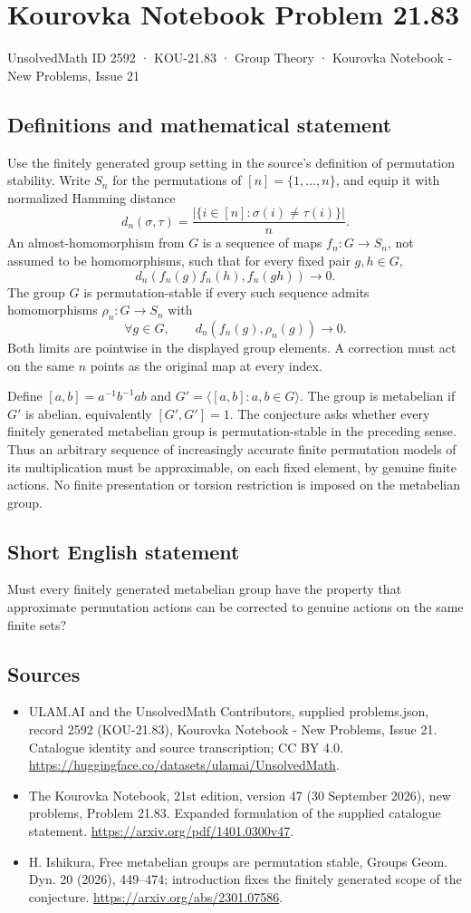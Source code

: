 \documentclass[11pt,a4paper]{article}
\begin{document}
\section*{Kourovka Notebook Problem 21.83}\label{2592}
{\small UnsolvedMath ID 2592 · KOU-21.83 · Group Theory · Kourovka Notebook - New Problems, Issue 21}
\subsection{Definitions and mathematical statement}
Use the finitely generated group setting in the source's definition of permutation stability. Write $S_n$ for the permutations of $[n]=\{1,\ldots,n\}$, and equip it with normalized Hamming distance
\[
 d_n(\sigma,\tau)=\frac{|\{i\in[n]:\sigma(i)\ne\tau(i)\}|}{n}.
\]
An almost-homomorphism from $G$ is a sequence of maps $f_n:G\to S_n$, not assumed to be homomorphisms, such that for every fixed pair $g,h\in G$,
\[
 d_n(f_n(g)f_n(h),f_n(gh))\longrightarrow0.
\]
The group $G$ is permutation-stable if every such sequence admits homomorphisms $\rho_n:G\to S_n$ with
\[
 \forall g\in G,\qquad d_n(f_n(g),\rho_n(g))\longrightarrow0.
\]
Both limits are pointwise in the displayed group elements. A correction must act on the same $n$ points as the original map at every index.

Define $[a,b]=a^{-1}b^{-1}ab$ and $G'=\langle[a,b]:a,b\in G\rangle$. The group is metabelian if $G'$ is abelian, equivalently $[G',G']=1$. The conjecture asks whether every finitely generated metabelian group is permutation-stable in the preceding sense. Thus an arbitrary sequence of increasingly accurate finite permutation models of its multiplication must be approximable, on each fixed element, by genuine finite actions. No finite presentation or torsion restriction is imposed on the metabelian group.
\subsection{Short English statement}
Must every finitely generated metabelian group have the property that approximate permutation actions can be corrected to genuine actions on the same finite sets?
\subsection{Sources}
\begin{itemize}
\item[S1] ULAM.AI and the UnsolvedMath Contributors, supplied problems.json, record 2592 (KOU-21.83), Kourovka Notebook - New Problems, Issue 21. Catalogue identity and source transcription; CC BY 4.0.
\url{https://huggingface.co/datasets/ulamai/UnsolvedMath}.
\item[S2] The Kourovka Notebook, 21st edition, version 47 (30 September 2026), new problems, Problem 21.83. Expanded formulation of the supplied catalogue statement.
\url{https://arxiv.org/pdf/1401.0300v47}.
\item[S3] H. Ishikura, Free metabelian groups are permutation stable, Groups Geom. Dyn. 20 (2026), 449--474; introduction fixes the finitely generated scope of the conjecture.
\url{https://arxiv.org/abs/2301.07586}.
\end{itemize}
\end{document}
